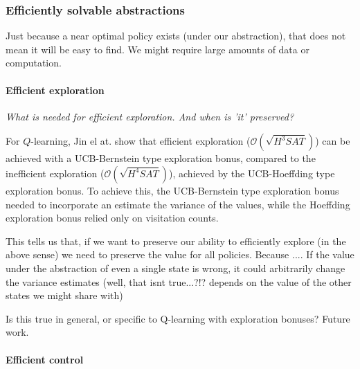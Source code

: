\subsubsection{Efficiently solvable abstractions}

Just because a near optimal policy exists (under our abstraction), that does not mean it will be easy to find.
We might require large amounts of data or computation.

\paragraph{Efficient exploration}

\begin{displayquote}
\textit{What is needed for efficient exploration. And when is 'it' preserved?}
\end{displayquote}

For $Q$-learning, Jin el at. \cite{Bubeck2018} show that efficient exploration ($\mathcal O(\sqrt{H^3SAT})$\footnotemark[13]) can be
achieved with a UCB-Bernstein type exploration bonus, compared to the inefficient exploration ($\mathcal O(\sqrt{H^4SAT})$),
achieved by the UCB-Hoeffding type exploration bonus. To achieve this, the UCB-Bernstein type exploration bonus needed to incorporate an
estimate the variance of the values, while the Hoeffding exploration bonus relied only on visitation counts.


This tells us that, if we want to preserve our ability to efficiently explore (in the above sense) we need to preserve the value for all policies.
Because ....
If the value under the abstraction of even a single state is wrong, it could arbitrarily change the variance estimates
(well, that isnt true...?!? depends on the value of the other states we might share with)

Is this true in general, or specific to Q-learning with exploration bonuses? Future work.

\paragraph{Efficient control}

